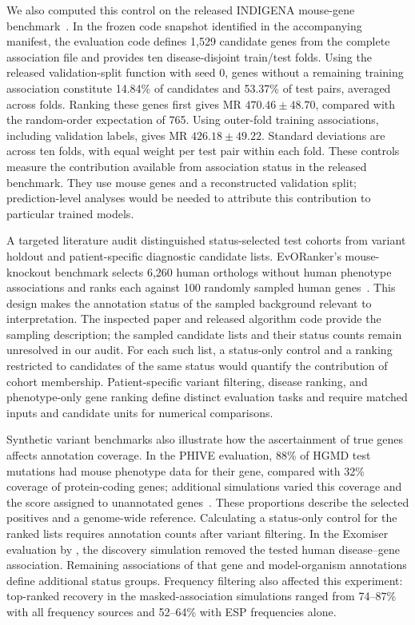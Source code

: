 \documentclass{article}
\begin{document}
We also computed this control on the released INDIGENA mouse-gene
benchmark~\citep{indigena}. In the frozen code snapshot identified in the accompanying manifest, the evaluation code
defines 1{,}529 candidate genes from the complete association file and
provides ten disease-disjoint train/test folds. Using the released
validation-split function with seed 0, genes without a remaining training
association constitute 14.84\% of candidates and 53.37\% of test pairs,
averaged across folds. Ranking these genes first gives MR
$470.46\pm48.70$, compared with the random-order expectation of 765.
Using outer-fold training associations, including validation labels,
gives MR $426.18\pm49.22$. Standard deviations are across ten folds,
with equal weight per test pair within each fold. These controls measure
the contribution available from association status in the released
benchmark. They use mouse genes and a reconstructed validation split;
prediction-level analyses would be needed to attribute this contribution
to particular trained models.

A targeted literature audit distinguished status-selected test cohorts
from variant holdout and patient-specific diagnostic candidate lists.
EvORanker's mouse-knockout benchmark selects 6{,}260 human orthologs
without human phenotype associations and ranks each against 100 randomly
sampled human genes~\citep{canavati2024evoranker}. This design makes the
annotation status of the sampled background relevant to interpretation.
The inspected paper and released algorithm code provide the sampling
description; the sampled candidate lists and their status counts remain
unresolved in our audit. For each such list, a status-only control and a
ranking restricted to candidates of the same status would quantify the
contribution of cohort membership. Patient-specific variant filtering,
disease ranking, and phenotype-only gene ranking define distinct
evaluation tasks and require matched inputs and candidate units for
numerical comparisons.

Synthetic variant benchmarks also illustrate how the ascertainment of
true genes affects annotation coverage. In the PHIVE evaluation,
88\% of HGMD test mutations had mouse phenotype data for their gene,
compared with 32\% coverage of protein-coding genes; additional simulations
varied this coverage and the score assigned to unannotated
genes~\citep{robinson2014improved}. These proportions describe the selected
positives and a genome-wide reference. Calculating a status-only control
for the ranked lists requires annotation counts after variant filtering.
In the Exomiser evaluation by \citet{bone2016computational}, the discovery
simulation removed the tested human disease--gene association. Remaining
associations of that gene and model-organism annotations define additional
status groups. Frequency filtering also affected this experiment:
top-ranked recovery in the masked-association simulations ranged from
74--87\% with all frequency sources and 52--64\% with ESP frequencies alone.
\end{document}
